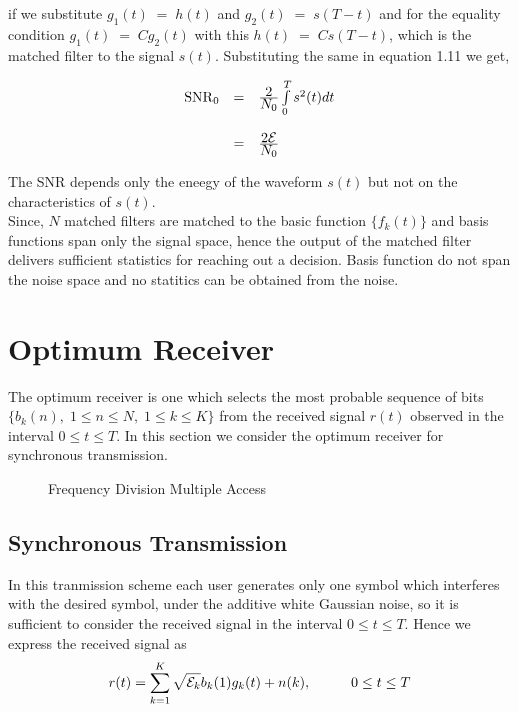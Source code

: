 if we substitute $g_1(t)\;=\;h(t)$ and $g_2(t)\;=\;s(T-t)$ and for the equality condition $g_1(t)\;=\;Cg_2(t)$ with this $h(t)\;=\;Cs(T-t)$, which is the matched filter to the signal $s(t)$. Substituting the same in equation 1.11 we get,

\begin{eqnarray}
\begin{array}{lll}
\mathrm{SNR}_0&=&\frac{\hbox{$2$}}{\hbox{$N_0$}}\int\limits_{0}^{T}s^2(t)dt \\ \\
&=&\frac{\hbox{$2\mathcal{E}$}}{\hbox{$N_0$}}
\end{array}
\end{eqnarray}

The SNR depends only the eneegy of the waveform $s(t)$ but not on the characteristics of $s(t)$.\\

Since, $N$ matched filters are matched to the basic function $\{f_k(t)\}$ and basis functions span only the signal space, hence the output of the matched filter delivers sufficient statistics for reaching out a decision. Basis function do not span the noise space and no statitics can be obtained from the noise.


\section{Optimum Receiver}
The optimum receiver is one which selects the most probable sequence of bits $\{b_k(n),\;1\leq n \leq N,\;1\leq k \leq K\}$ from the received signal $r(t)$ observed in the interval $0\leq t \leq T$. In this section we consider the optimum receiver for synchronous transmission.
\begin{figure}[htb]
  \centerline{  }
  \caption{Frequency Division Multiple Access}
\end{figure}
\subsection{Synchronous Transmission}
In this tranmission scheme each user generates only one symbol which interferes with the desired symbol, under the additive white Gaussian noise, so it is sufficient to consider the received signal in the interval $0\leq t \leq T$. Hence we express the received signal as
\begin{equation}
r(t)=\sum\limits_{k=1}^{K} \sqrt{\mathcal{E}_k} b_k(1)g_k(t)+n(k),\hspace{10mm} 0\leq t \leq T
\end{equation}

